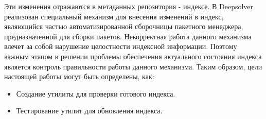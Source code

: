 \documentclass[a4paper]{article}
\begin{document}
Эти изменения отражаются в метаданных репозитория - индексе.
\newpage
В  Deepsolver реализован специальный механизм для внесения изменений в индекс,
являющийся частью автоматизированной сборочницы пакетного менеджера, 
предназначенной для сборки пакетов. Некорректная работа данного механизма влечет за собой 
нарушение целостности индексной информации. Поэтому важным этапом в решении 
проблемы обеспечения актуального состояния индекса является контроль правильности 
работы данного механизма. 
\newpage
Таким образом, цели настоящей работы могут быть определены, как:
\begin{itemize}
\item
Создание утилиты для проверки готового индекса.
\item
Тестирование утилит для обновления индекса.
\end{itemize}
\end{document}
